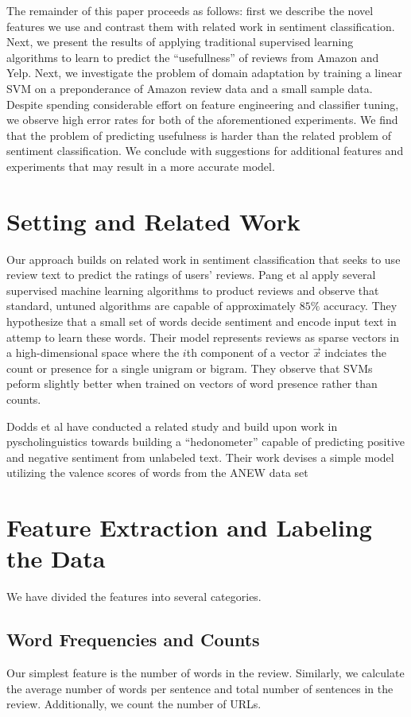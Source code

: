 \documentclass[letterpaper]{article}
\begin{document}
The remainder of this paper proceeds as follows: first we describe the novel 
features we use and contrast them with related work in sentiment 
classification.  Next, we present the results of applying traditional 
supervised learning algorithms to learn to predict the ``usefullness'' of 
reviews from Amazon and Yelp.  Next, we investigate the problem of domain 
adaptation by training a linear SVM on a preponderance of Amazon review data 
and a small sample data.  Despite spending considerable effort on feature 
engineering and classifier tuning, we observe high error rates for both of the 
aforementioned experiments.  We find that the problem of predicting usefulness 
is harder than the related problem of sentiment classification.  We conclude 
with suggestions for additional features and experiments that may result in a more accurate model.

\section{Setting and Related Work}
Our approach builds on related work in sentiment classification that seeks to use 
review text to predict the ratings of users' reviews.  Pang et al \cite{PangSentimentClassification}
apply several supervised machine learning algorithms to product reviews and observe that 
standard, untuned algorithms are capable of approximately $85\%$ accuracy.  They hypothesize that
a small set of words decide sentiment and encode input text in attemp to learn these words. 
Their model represents reviews as sparse vectors in a high-dimensional space where the $i$th component 
of a vector $\vec{x}$ indciates the count or presence for a single unigram or bigram.  They observe
that SVMs peform slightly better when trained on vectors of word presence rather than counts.

Dodds et al \cite{DoddsANEWPaper} have conducted a related study and build upon work in 
pyscholinguistics towards building a ``hedonometer'' capable of predicting positive 
and negative sentiment from unlabeled text.  Their work devises a simple model utilizing the 
valence scores of words from the ANEW data set

\section{Feature Extraction and Labeling the Data}
We have divided the features into several categories.
\subsection{Word Frequencies and Counts}
Our simplest feature is the number of words in the review. Similarly,
we calculate the average number of words per sentence and total number
of sentences in the review. Additionally, we count the number of URLs.
\end{document}
